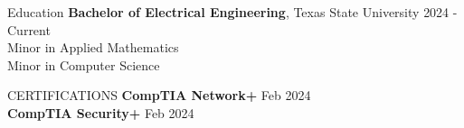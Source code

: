 \documentclass{résumé} %
\begin{document}

\begin{rSection}{Education}
{\bf Bachelor of Electrical Engineering}, Texas State University \hfill {2024 - Current}\\
Minor in Applied Mathematics \\
Minor in Computer Science
\end{rSection}
\begin{rSection}{CERTIFICATIONS}
{\bf CompTIA Network+} \hfill {Feb 2024} \\
{\bf CompTIA Security+} \hfill {Feb 2024}
\end{rSection}
\end{document}

